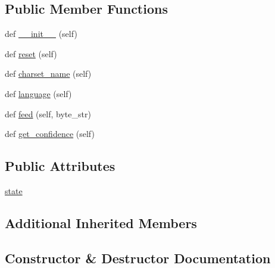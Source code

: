 \subsection*{Public Member Functions}
\begin{DoxyCompactItemize}
\item 
def \hyperlink{classpip_1_1__vendor_1_1chardet_1_1latin1prober_1_1Latin1Prober_a1ccd237ab8334a851c516440caf335cf}{\+\_\+\+\_\+init\+\_\+\+\_\+} (self)
\item 
def \hyperlink{classpip_1_1__vendor_1_1chardet_1_1latin1prober_1_1Latin1Prober_ae93a3d62962944fa76d73ce58c63efed}{reset} (self)
\item 
def \hyperlink{classpip_1_1__vendor_1_1chardet_1_1latin1prober_1_1Latin1Prober_a83d17ea6c3e80e6ef4991b3edb6d86ca}{charset\+\_\+name} (self)
\item 
def \hyperlink{classpip_1_1__vendor_1_1chardet_1_1latin1prober_1_1Latin1Prober_a1df41411b438778c9d2253835ef046b6}{language} (self)
\item 
def \hyperlink{classpip_1_1__vendor_1_1chardet_1_1latin1prober_1_1Latin1Prober_a30e002c1c507b761cdf7cd1ced7f5b3b}{feed} (self, byte\+\_\+str)
\item 
def \hyperlink{classpip_1_1__vendor_1_1chardet_1_1latin1prober_1_1Latin1Prober_a353697dd239601108738118b6395952d}{get\+\_\+confidence} (self)
\end{DoxyCompactItemize}
\subsection*{Public Attributes}
\begin{DoxyCompactItemize}
\item 
\hyperlink{classpip_1_1__vendor_1_1chardet_1_1latin1prober_1_1Latin1Prober_a6bcc5503fcc2f33ef3739d96848db0f1}{state}
\end{DoxyCompactItemize}
\subsection*{Additional Inherited Members}


\subsection{Constructor \& Destructor Documentation}
\mbox{\label{classpip_1_1__vendor_1_1chardet_1_1latin1prober_1_1Latin1Prober_a1ccd237ab8334a851c516440caf335cf}} 

